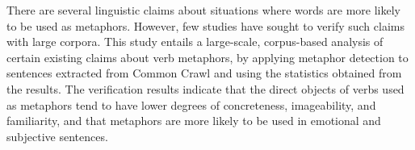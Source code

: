 There are several linguistic claims about situations where words are more likely to be used as metaphors. However, few studies have sought to verify such claims with large corpora. This study entails a large-scale, corpus-based analysis of certain existing claims about verb metaphors, by applying metaphor detection to sentences extracted from Common Crawl and using the statistics obtained from the results. The verification results indicate that the direct objects of verbs used as metaphors tend to have lower degrees of concreteness, imageability, and familiarity, and that metaphors are more likely to be used in emotional and subjective sentences.